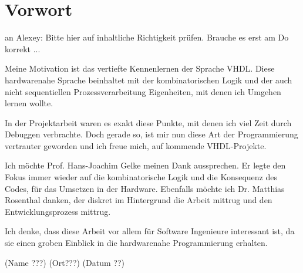 
\chapter*{Vorwort}\label{chap.vorwort}
an Alexey: Bitte hier auf inhaltliche Richtigkeit prüfen. Brauche es erst am Do
korrekt ...

Meine Motivation ist das vertiefte Kennenlernen der Sprache VHDL. Diese hardwarenahe Sprache beinhaltet mit der kombinatorischen Logik und der auch nicht sequentiellen Prozessverarbeitung Eigenheiten, mit denen ich Umgehen lernen wollte.

In der Projektarbeit waren es exakt diese Punkte, mit denen ich viel Zeit durch Debuggen verbrachte. Doch gerade so, ist mir nun diese Art der Programmierung vertrauter geworden und ich freue mich, auf kommende VHDL-Projekte.

Ich möchte Prof. Hans-Joachim Gelke meinen Dank aussprechen. Er legte den Fokus immer wieder auf die kombinatorische Logik und die Konsequenz des Codes, für das Umsetzen in der Hardware. Ebenfalls möchte ich Dr. Matthias Rosenthal danken, der diskret im Hintergrund die Arbeit mittrug und den Entwicklungsprozess mittrug.

Ich denke, dass diese Arbeit vor allem für Software Ingenieure interessant ist, da sie einen groben Einblick in die hardwarenahe Programmierung erhalten.

(Name ???)
(Ort???)
(Datum ??)\\


